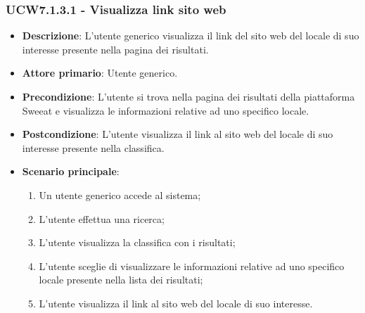 \subsubsection{UCW7.1.3.1 - Visualizza link sito web}
\begin{itemize}
	\item \textbf{Descrizione}: L'utente generico visualizza il link del sito web del locale di suo interesse presente nella pagina dei risultati.
    \item \textbf{Attore primario}: Utente generico.
    \item \textbf{Precondizione}: L’utente si trova nella pagina dei risultati della piattaforma Sweeat e visualizza le informazioni relative ad uno specifico locale.
    \item \textbf{Postcondizione}: L’utente visualizza il link al sito web del locale di suo interesse presente nella classifica.
    \item \textbf{Scenario principale}: 
    \begin{enumerate}
        \item Un utente generico accede al sistema;
        \item L’utente effettua una ricerca;
        \item L'utente visualizza la classifica con i risultati;
        \item L'utente sceglie di visualizzare le informazioni relative ad uno specifico locale presente nella lista dei risultati;
        \item L'utente visualizza il link al sito web del locale di suo interesse.
    \end{enumerate}
\end{itemize}

